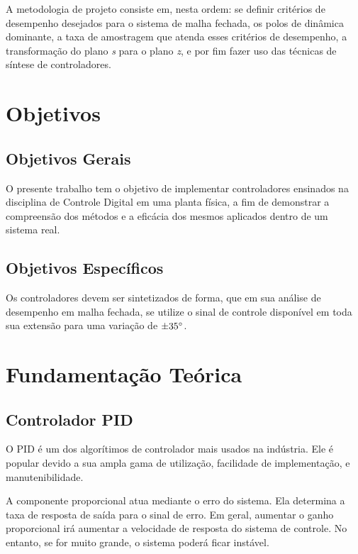 \documentclass[conference,harvard,brazil,english]{sbatex}
\begin{document}
        A metodologia de projeto consiste em, nesta ordem: se definir critérios de desempenho desejados para o sistema de malha fechada, os polos de dinâmica dominante, a taxa de amostragem que atenda esses critérios de desempenho, a transformação do plano \textit{s} para o plano \textit{z}, e por fim fazer uso das técnicas de síntese de controladores.
        
    \section{Objetivos}
        
        \subsection{Objetivos Gerais}
            
            O presente trabalho tem o objetivo de implementar controladores ensinados na disciplina de Controle Digital em uma planta física, a fim de demonstrar a compreensão dos métodos e a eficácia dos mesmos aplicados dentro de um sistema real.
        
        \subsection{Objetivos Específicos}
            
            Os controladores devem ser sintetizados de forma, que em sua análise de desempenho em malha fechada, se utilize o sinal de controle disponível em toda sua extensão para uma variação de $\pm35\degree$.
    
    \section{Fundamentação Teórica}
        
        \subsection{Controlador PID}
        
            O PID é um dos algorítimos de controlador mais usados na indústria. Ele é popular devido a sua ampla gama de utilização, facilidade de implementação, e manutenibilidade.
            
            A componente proporcional atua mediante o erro do sistema. Ela determina a taxa de resposta de saída para o sinal de erro. Em geral, aumentar o ganho proporcional irá aumentar a velocidade de resposta do sistema de controle. No entanto, se for muito grande, o sistema poderá ficar instável.
            
\end{document}
